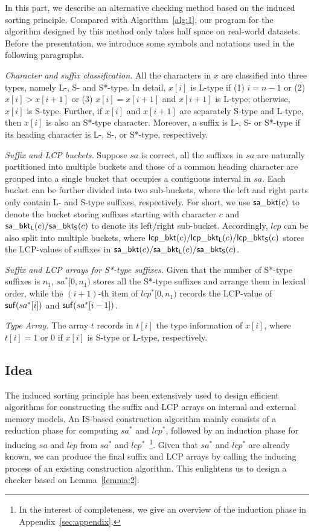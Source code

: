 \documentclass[10pt,journal,compsoc]{IEEEtran}
\begin{document}
In this part, we describe an alternative checking method based on the induced sorting principle. Compared with Algorithm~\ref{alg:1}, our program for the algorithm designed by this method only takes half space on real-world datasets. Before the presentation, we introduce some symbols and notations used in the following paragraphs.

{\em Character and suffix classification.} All the characters in $x$ are classified into three types, namely L-, S- and S*-type. In detail, $x[i]$ is L-type if (1) $i = n - 1$ or (2) $x[i] > x[i + 1]$ or (3) $x[i] = x[i + 1]$ and $x[i + 1]$ is L-type; otherwise, $x[i]$ is S-type. Further, if $x[i]$ and $x[i + 1]$ are separately S-type and L-type, then $x[i]$ is also an S*-type character. Moreover, a suffix is L-, S- or S*-type if its heading character is L-, S-, or S*-type, respectively.

{\em Suffix and LCP buckets.} Suppose $sa$ is correct, all the suffixes in $sa$ are naturally partitioned into multiple buckets and those of a common heading character are grouped into a single bucket that occupies a contiguous interval in $sa$. Each bucket can be further divided into two sub-buckets, where the left and right parts only contain L- and S-type suffixes, respectively. For short, we use ${\sf sa\_bkt}(c)$ to denote the bucket storing suffixes starting with character $c$ and ${\sf sa\_bkt_L}(c)/{\sf sa\_bkt_S}(c)$ to denote its left/right sub-bucket. Accordingly, $lcp$ can be also split into multiple buckets, where ${\sf lcp\_bkt}(c)/{\sf lcp\_bkt_L}(c)/{\sf lcp\_bkt_S}(c)$ stores the LCP-values of suffixes in ${\sf sa\_bkt}(c)/{\sf sa\_bkt_L}(c)/{\sf sa\_bkt_S}(c)$.

{\em Suffix and LCP arrays for S*-type suffixes.} Given that the number of S*-type suffixes is $n_1$, $sa^*[0, n_1)$ stores all the S*-type suffixes and arrange them in lexical order, while the $(i + 1)$-th item of $lcp^*[0, n_1)$ records the LCP-value of ${\sf suf}(sa^*[i])$ and ${\sf suf}(sa^*[i - 1])$.

{\em Type Array.} The array $t$ records in $t[i]$ the type information of $x[i]$, where $t[i] = 1$ or $0$ if $x[i]$ is S-type or L-type, respectively.

\subsection{Idea} \label{sec:method2:idea}

The induced sorting principle has been extensively used to design efficient algorithms for constructing the suffix and LCP arrays on internal and external memory models. An IS-based construction algorithm mainly consists of a reduction phase for computing $sa^*$ and $lcp^*$, followed by an induction phase for inducing $sa$ and $lcp$ from $sa^*$ and $lcp^*$~\footnote{In the interest of completeness, we give an overview of the induction phase in Appendix~\ref{sec:appendix}.}. Given that $sa^*$ and $lcp^*$ are already known, we can produce the final suffix and LCP arrays by calling the inducing process of an existing construction algorithm. This enlightens us to design a checker based on Lemma~\ref{lemma:2}. 
	
\end{document}
